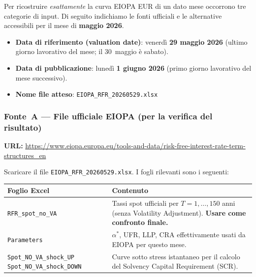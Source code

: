 \documentclass[11pt,a4paper]{article}
\theoremstyle{plain}
\theoremstyle{definition}
\theoremstyle{remark}
\begin{document}
Per ricostruire \emph{esattamente} la curva EIOPA EUR di un dato mese occorrono
tre categorie di input. Di seguito indichiamo le fonti ufficiali e le alternative
accessibili per il mese di \textbf{maggio 2026}.

\begin{keybox}
\begin{itemize}
  \item \textbf{Data di riferimento (valuation date)}: venerd\`i \textbf{29 maggio 2026}
        (ultimo giorno lavorativo del mese; il 30~maggio \`e sabato).
  \item \textbf{Data di pubblicazione}: luned\`i \textbf{1\textordmasculine{} giugno 2026}
        (primo giorno lavorativo del mese successivo).
  \item \textbf{Nome file atteso}: \texttt{EIOPA\_RFR\_20260529.xlsx}
\end{itemize}
\end{keybox}

\subsubsection*{Fonte~A --- File ufficiale EIOPA (per la verifica del risultato)}

\noindent\textbf{URL:}
\url{https://www.eiopa.europa.eu/tools-and-data/risk-free-interest-rate-term-structures\_en}

\noindent Scaricare il file \texttt{EIOPA\_RFR\_20260529.xlsx}.
I fogli rilevanti sono i seguenti:

\begin{center}\small
\renewcommand{\arraystretch}{1.25}
\begin{tabular}{lp{9cm}}
\toprule
\textbf{Foglio Excel} & \textbf{Contenuto} \\
\midrule
\texttt{RFR\_spot\_no\_VA}  & Tassi spot ufficiali per $T=1,\ldots,150$ anni (senza
                               Volatility Adjustment). \textbf{Usare come confronto
                               finale.} \\
\texttt{Parameters}         & $\alpha^*$, UFR, LLP, CRA effettivamente usati da EIOPA
                               per questo mese. \\
\texttt{Spot\_NO\_VA\_shock\_UP} \newline
\texttt{Spot\_NO\_VA\_shock\_DOWN} & Curve sotto stress istantaneo per il calcolo
                               del Solvency Capital Requirement (SCR). \\
\bottomrule
\end{tabular}
\end{center}
\end{document}
